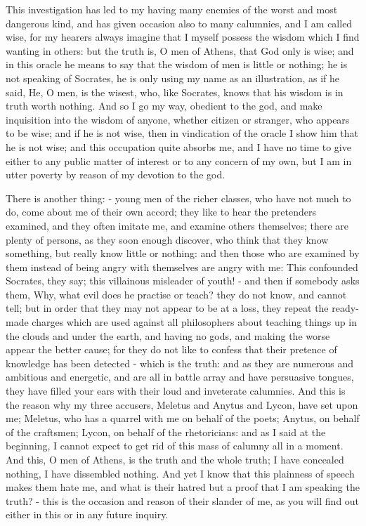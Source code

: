 \documentclass[11pt]{article}
\begin{document}
This investigation has led to my having many enemies of the worst and most dangerous kind, and has given occasion also to many calumnies, and I am called wise, for my hearers always imagine that I myself possess the wisdom which I find wanting in others: but the truth is, O men of Athens, that God only is wise; and in this oracle he means to say that the wisdom of men is little or nothing; he is not speaking of Socrates, he is only using my name as an illustration, as if he said, He, O men, is the wisest, who, like Socrates, knows that his wisdom is in truth worth nothing. And so I go my way, obedient to the god, and make inquisition into the wisdom of anyone, whether citizen or stranger, who appears to be wise; and if he is not wise, then in vindication of the oracle I show him that he is not wise; and this occupation quite absorbs me, and I have no time to give either to any public matter of interest or to any concern of my own, but I am in utter poverty by reason of my devotion to the god.

There is another thing: - young men of the richer classes, who have not much to do, come about me of their own accord; they like to hear the pretenders examined, and they often imitate me, and examine others themselves; there are plenty of persons, as they soon enough discover, who think that they know something, but really know little or nothing: and then those who are examined by them instead of being angry with themselves are angry with me: This confounded Socrates, they say; this villainous misleader of youth! - and then if somebody asks them, Why, what evil does he practise or teach? they do not know, and cannot tell; but in order that they may not appear to be at a loss, they repeat the ready-made charges which are used against all philosophers about teaching things up in the clouds and under the earth, and having no gods, and making the worse appear the better cause; for they do not like to confess that their pretence of knowledge has been detected - which is the truth: and as they are numerous and ambitious and energetic, and are all in battle array and have persuasive tongues, they have filled your ears with their loud and inveterate calumnies. And this is the reason why my three accusers, Meletus and Anytus and Lycon, have set upon me; Meletus, who has a quarrel with me on behalf of the poets; Anytus, on behalf of the craftsmen; Lycon, on behalf of the rhetoricians: and as I said at the beginning, I cannot expect to get rid of this mass of calumny all in a moment. And this, O men of Athens, is the truth and the whole truth; I have concealed nothing, I have dissembled nothing. And yet I know that this plainness of speech makes them hate me, and what is their hatred but a proof that I am speaking the truth? - this is the occasion and reason of their slander of me, as you will find out either in this or in any future inquiry.
\end{document}
